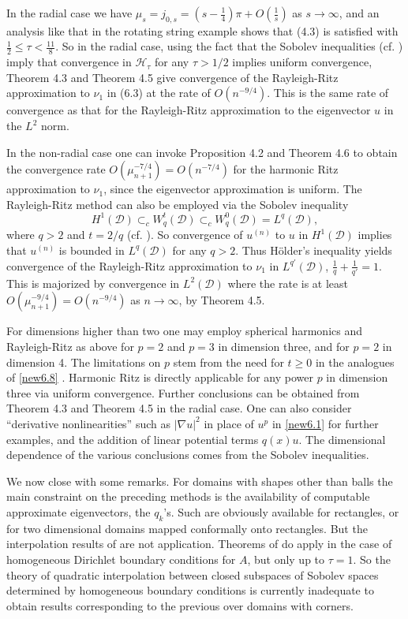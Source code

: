 \documentclass[final]{siamltex}
\numberwithin{equation}{section}
\begin{document}
In the radial case we have $\mu_s = j_{0,s} = (s-\frac{1}{4}) \pi + O(\frac{1}{s})$ as $s\to \infty$, \cite{AS} and an analysis like that in the rotating string example shows that (4.3) is satisfied with $\frac{1}{2}\le \tau <\frac{11}{8}$. So in the radial case, using the fact that the Sobolev inequalities (cf. \cite{Grisvard2}) imply that convergence in $\mathcal{H}_{\tau}$ for any $\tau>1/2$ implies uniform convergence, Theorem 4.3 and Theorem 4.5 give convergence of the Rayleigh-Ritz approximation to $\nu_1$ in (6.3) at the rate of $O(n^{-9/4})$. This is the same rate of convergence as that for the Rayleigh-Ritz approximation to the eigenvector $u$ in the $L^2$ norm.

In the non-radial case one can invoke Proposition 4.2 and Theorem 4.6 to obtain the convergence rate $O(\mu_{n+1}^{-7/4})=O(n^{-7/4})$ for the harmonic Ritz approximation to $\nu_1$, since the eigenvector approximation is uniform. The Rayleigh-Ritz method can also be employed via the Sobolev inequality
\begin{equation} \label{new6.8}
H^1(\mathcal{D}) \subset_{c} W^t_{q}(\mathcal{D}) \subset_c
W^0_{q}(\mathcal{D})=L^{q}(\mathcal{D}),
\end{equation}
where $q>2$ and $t=2/q$ (cf. \cite{Grisvard2}). So convergence of $u^{(n)}$ to $u$ in $H^1(\mathcal{D})$ implies that $u^{(n)}$ is bounded in $L^{q}(\mathcal{D})$ for any $q>2$. Thus H\"older's inequality yields convergence of the Rayleigh-Ritz approximation to $\nu_1$ in $L^{q'}(\mathcal{D})$, $\frac{1}{q}+\frac{1}{q'}=1$. This is majorized by convergence in $L^2(\mathcal{D})$ where the rate is at least $O(\mu_{n+1}^{-9/4})= O(n^{-9/4})$ as $n\to \infty$, by Theorem 4.5.

For dimensions higher than two one may employ spherical harmonics and Rayleigh-Ritz as above for $p=2$ and $p=3$ in dimension three, and for $p=2$ in dimension 4. The limitations on $p$ stem from the need for $t\ge 0$ in the analogues of \eqref{new6.8} \cite{Grisvard2}. Harmonic Ritz is directly applicable for any power $p$ in dimension three via uniform convergence. Further conclusions can be obtained from Theorem 4.3 and Theorem 4.5 in the radial case. One can also consider ``derivative nonlinearities'' such as $|\nabla u|^2$ in place of $u^p$ in \eqref{new6.1} for further examples, and the addition of linear potential terms $q(x) u$. The dimensional dependence of the various conclusions comes from the Sobolev inequalities.

We now close with some remarks. For domains with shapes other than balls the main constraint on the preceding methods is the availability of computable approximate eigenvectors, the $q_k$'s. Such are obviously available for rectangles, or for two dimensional domains mapped conformally onto rectangles. But the interpolation results of \cite{Grisvard} are not application. Theorems of \cite{Greenlee} do apply in the case of homogeneous Dirichlet boundary conditions for $A$, but only up to $\tau=1$. So the theory of quadratic interpolation between closed subspaces of Sobolev spaces determined by homogeneous boundary conditions is currently inadequate to obtain results corresponding to the previous over domains with corners.
\end{document}
